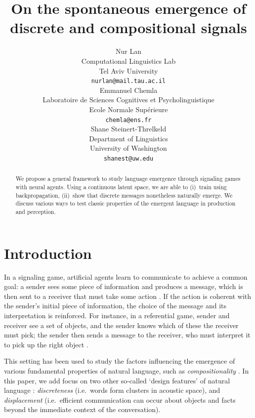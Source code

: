 \documentclass[11pt,a4paper]{article}
\title{On the spontaneous emergence of discrete and compositional signals}
\author{Nur Lan \\
  Computational Linguistics Lab \\
  Tel Aviv University \\
  \texttt{nurlan@mail.tau.ac.il} \\\And
  Emmanuel Chemla \\
  Laboratoire de Sciences Cognitives et Psycholinguistique \\
  Ecole Normale Sup\'erieure \\
  \texttt{chemla@ens.fr} \\\And
  Shane Steinert-Threlkeld \\
  Department of Linguistics \\
  University of Washington \\
  \texttt{shanest@uw.edu}
  }
\date{}
\begin{document}
\maketitle

\begin{abstract}
	We propose a general framework to study language emergence through signaling games with neural agents. Using a continuous latent space, we are able to (i)~train using backpropagation, (ii)~show that discrete messages nonetheless naturally emerge. We discuss various ways to test classic properties of the emergent language in production and perception.
\end{abstract}

\section{Introduction}

In a signaling game, artificial agents learn to communicate to achieve a common goal: a sender sees some piece of information and produces a message, which is then sent to a receiver that must take some action \citep{Lewis1969, Skyrms2010}. If the action is coherent with the sender's initial piece of information, the choice of the message and its interpretation is reinforced. 
For instance, in a referential game, sender and receiver see a set of objects, and the sender knows which of these the receiver must pick; the sender then sends a message to the receiver, who must interpret it to pick up the right object \citep{Lazaridou2017, Lazaridou2018, Havrylov2017, Chaabouni2019a}.

This setting has been used to study the factors influencing the emergence of various fundamental properties of natural language, such as \emph{compositionality} \citep{Kirby2015, Franke2016, SteinertThrelkeld2016, Mordatch2018, Lazaridou2018, Choi2018}.
In this paper, we add focus on two other so-called `design features' of natural language \citep{Hockett1960}: 
\emph{discreteness} (i.e.~words form clusters in acoustic space), 
and \emph{displacement} (i.e.~efficient communication can occur about objects and facts beyond the immediate context of the conversation).
\end{document}
